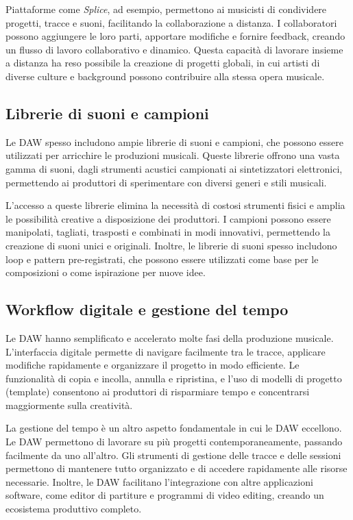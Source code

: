 \documentclass{book}
\begin{document}
Piattaforme come \textit{Splice}, ad esempio, permettono ai musicisti di condividere progetti, tracce e suoni, facilitando la collaborazione a distanza. I collaboratori possono aggiungere le loro parti, apportare modifiche e fornire feedback, creando un flusso di lavoro collaborativo e dinamico. Questa capacità di lavorare insieme a distanza ha reso possibile la creazione di progetti globali, in cui artisti di diverse culture e background possono contribuire alla stessa opera musicale.

\subsection{Librerie di suoni e campioni}

Le DAW spesso includono ampie librerie di suoni e campioni, che possono essere utilizzati per arricchire le produzioni musicali. Queste librerie offrono una vasta gamma di suoni, dagli strumenti acustici campionati ai sintetizzatori elettronici, permettendo ai produttori di sperimentare con diversi generi e stili musicali.

L’accesso a queste librerie elimina la necessità di costosi strumenti fisici e amplia le possibilità creative a disposizione dei produttori. I campioni possono essere manipolati, tagliati, trasposti e combinati in modi innovativi, permettendo la creazione di suoni unici e originali. Inoltre, le librerie di suoni spesso includono loop e pattern pre-registrati, che possono essere utilizzati come base per le composizioni o come ispirazione per nuove idee.

\subsection{Workflow digitale e gestione del tempo}

Le DAW hanno semplificato e accelerato molte fasi della produzione musicale. L’interfaccia digitale permette di navigare facilmente tra le tracce, applicare modifiche rapidamente e organizzare il progetto in modo efficiente. Le funzionalità di copia e incolla, annulla e ripristina, e l’uso di modelli di progetto (template) consentono ai produttori di risparmiare tempo e concentrarsi maggiormente sulla creatività.

La gestione del tempo è un altro aspetto fondamentale in cui le DAW eccellono. Le DAW permettono di lavorare su più progetti contemporaneamente, passando facilmente da uno all’altro. Gli strumenti di gestione delle tracce e delle sessioni permettono di mantenere tutto organizzato e di accedere rapidamente alle risorse necessarie. Inoltre, le DAW facilitano l’integrazione con altre applicazioni software, come editor di partiture e programmi di video editing, creando un ecosistema produttivo completo.
\end{document}

